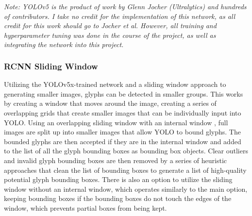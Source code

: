 \textit{Note: YOLOv5 is the product of work by Glenn Jocher (Ultralytics) and hundreds of contributors. I take no credit for the implementation of this network, as all credit for this work should go to Jocher et al. However, all training and hyperparameter tuning was done in the course of the project, as well as integrating the network into this project.}

\subsubsection{RCNN Sliding Window}
Utilizing the YOLOv5x-trained network and a sliding window approach to generating smaller images, glyphs can be detected in smaller groups. This works by creating a window that moves around the image, creating a series of overlapping grids that create smaller images that can be individually input into YOLO. Using an overlapping sliding window with an internal window , full images are split up into smaller images that allow YOLO to bound glyphs. The bounded glyphs are then accepted if they are in the internal window and added to the list of all the glyph bounding boxes as bounding box objects. Clear outliers and invalid glyph bounding boxes are then removed by a series of heuristic approaches that clean the list of bounding boxes to generate a list of high-quality potential glyph bounding boxes. There is also an option to utilize the sliding window without an internal window, which operates similarly to the main option, keeping bounding boxes if the bounding boxes do not touch the edges of the window, which prevents partial boxes from being kept.

